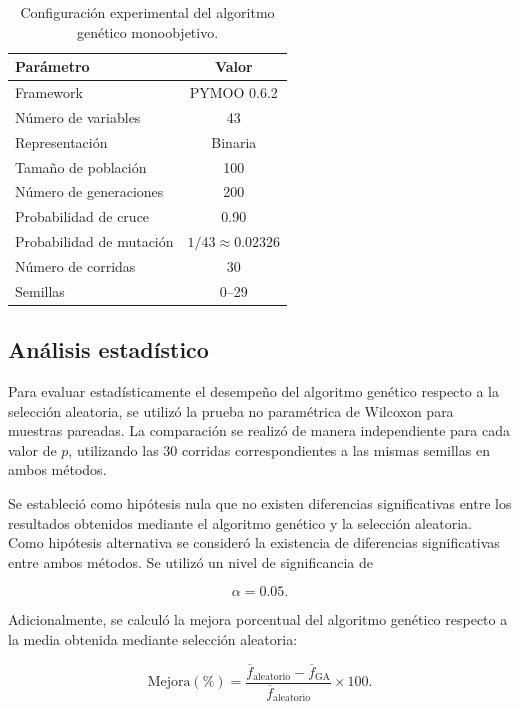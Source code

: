 \documentclass[journal]{IEEEtran}
\begin{document}
\begin{table}[!t]
	\centering
	\caption{Configuración experimental del algoritmo genético monoobjetivo.}
	\label{tab:parametros_ga}
	\begin{tabular}{lc}
		\toprule
		\textbf{Parámetro} & \textbf{Valor} \\
		\midrule
		Framework & PYMOO 0.6.2 \\
		Número de variables & 43 \\
		Representación & Binaria \\
		Tamaño de población & 100 \\
		Número de generaciones & 200 \\
		Probabilidad de cruce & 0.90 \\
		Probabilidad de mutación & $1/43 \approx 0.02326$ \\
		Número de corridas & 30 \\
		Semillas & 0--29 \\
		\bottomrule
	\end{tabular}
\end{table}

\subsection{Análisis estadístico}

Para evaluar estadísticamente el desempeño del algoritmo genético respecto a la selección aleatoria, se utilizó la prueba no paramétrica de Wilcoxon para muestras pareadas. La comparación se realizó de manera independiente para cada valor de $p$, utilizando las 30 corridas correspondientes a las mismas semillas en ambos métodos.

Se estableció como hipótesis nula que no existen diferencias significativas entre los resultados obtenidos mediante el algoritmo genético y la selección aleatoria. Como hipótesis alternativa se consideró la existencia de diferencias significativas entre ambos métodos. Se utilizó un nivel de significancia de

\begin{equation}
	\alpha = 0.05.
\end{equation}

Adicionalmente, se calculó la mejora porcentual del algoritmo genético respecto a la media obtenida mediante selección aleatoria:

\begin{equation}
	\text{Mejora}(\%) =
	\frac{
		\overline{f}_{\mathrm{aleatorio}}
		-
		\overline{f}_{\mathrm{GA}}
	}{
		\overline{f}_{\mathrm{aleatorio}}
	}
	\times 100.
\end{equation}
\end{document}
